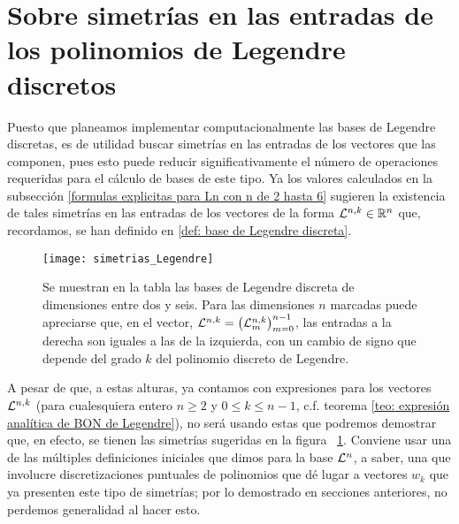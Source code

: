 \section{ Sobre simetrías en las entradas de los polinomios de Legendre discretos}
\label{section: sobre simetrias en las entradas de los poliomios discretos de Legendre}
Puesto que planeamos implementar computacionalmente
las bases de Legendre discretas, es de utilidad 
buscar simetrías en las entradas de los vectores que las 
componen, pues esto puede reducir significativamente
el número de operaciones requeridas para el cálculo 
de bases de este tipo.
Ya los valores calculados
en la subsección 
\ref{formulas explicitas para Ln con n de 2 hasta 6}
sugieren 
la existencia de tales simetrías en las entradas 
de los vectores de la forma $\mathcal{L}^{n,k} \in \mathbb{R}^{n}$
que, recordamos, se han definido en 
\ref{def: base de Legendre discreta}.


\begin{figure}[H] \label{fig: simetrias entradas Legendre}
\centering\captionsetup{format = hang}
	\begin{measuredfigure}
		\texttt{[image: simetrias\_Legendre]} 
		\caption{
		Se muestran en la tabla las bases de Legendre
		discreta de dimensiones entre dos y seis. 		
		Para las dimensiones $n$ marcadas
		puede apreciarse que, en el vector,
		 $\mathcal{L}^{n,k} = \left( \mathcal{L}^{n,k}_{m} \right)_{m=0}^{n-1}$,
		las entradas a la derecha son iguales a las de la izquierda,
		con un cambio de signo que depende del
		grado $k$ del polinomio discreto de Legendre.}
		\label{fig: simetrias entradas Legendre}
 	\end{measuredfigure} 
 \end{figure}

A pesar de que, a estas alturas, ya contamos
con expresiones para los vectores $\mathcal{L}^{n,k}$
(para cualesquiera entero $n \geq 2$ y $0 \leq k \leq n-1$,
c.f. teorema \ref{teo: expresión analítica de BON de Legendre}),
no será usando estas que podremos demostrar que, en efecto,
se tienen las simetrías sugeridas en la figura
~\ref{fig: simetrias entradas Legendre}.
Conviene
usar una de las múltiples definiciones iniciales
que dimos para la base $\mathcal{L}^{n}$, a saber, una
que involucre discretizaciones puntuales de polinomios 
que dé lugar a vectores $w_{k}$ que ya presenten 
este tipo de simetrías; por lo demostrado en secciones anteriores,
no perdemos generalidad al hacer esto. 


